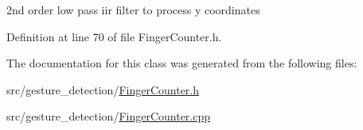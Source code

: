 2nd order low pass iir filter to process y coordinates 



Definition at line 70 of file Finger\+Counter.\+h.



The documentation for this class was generated from the following files\+:\begin{DoxyCompactItemize}
\item 
src/gesture\+\_\+detection/\hyperlink{_finger_counter_8h}{Finger\+Counter.\+h}\item 
src/gesture\+\_\+detection/\hyperlink{_finger_counter_8cpp}{Finger\+Counter.\+cpp}\end{DoxyCompactItemize}
